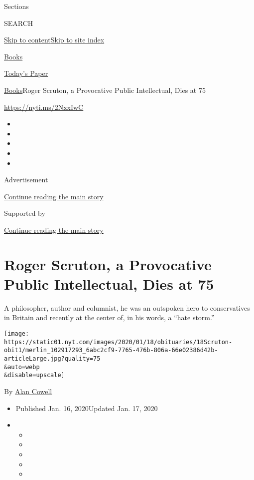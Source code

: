 Sections

SEARCH

\protect\hyperlink{site-content}{Skip to
content}\protect\hyperlink{site-index}{Skip to site index}

\href{https://www.nytimes.com/section/books}{Books}

\href{https://myaccount.nytimes.com/auth/login?response_type=cookie\&client_id=vi}{}

\href{https://www.nytimes.com/section/todayspaper}{Today's Paper}

\href{/section/books}{Books}\textbar{}Roger Scruton, a Provocative
Public Intellectual, Dies at 75

\url{https://nyti.ms/2NxxIwC}

\begin{itemize}
\item
\item
\item
\item
\item
\end{itemize}

Advertisement

\protect\hyperlink{after-top}{Continue reading the main story}

Supported by

\protect\hyperlink{after-sponsor}{Continue reading the main story}

\hypertarget{roger-scruton-a-provocative-public-intellectual-dies-at-75}{%
\section{Roger Scruton, a Provocative Public Intellectual, Dies at
75}\label{roger-scruton-a-provocative-public-intellectual-dies-at-75}}

A philosopher, author and columnist, he was an outspoken hero to
conservatives in Britain and recently at the center of, in his words, a
``hate storm.''

\texttt{[image: https://static01.nyt.com/images/2020/01/18/obituaries/18Scruton-obit1/merlin\_102917293\_6abc2cf9-7765-476b-806a-66e02386d42b-articleLarge.jpg?quality=75\\\&auto=webp\\\&disable=upscale]}

By \href{https://www.nytimes.com/by/alan-cowell}{Alan Cowell}

\begin{itemize}
\item
  Published Jan. 16, 2020Updated Jan. 17, 2020
\item
  \begin{itemize}
  \item
  \item
  \item
  \item
  \item
  \end{itemize}
\end{itemize}

